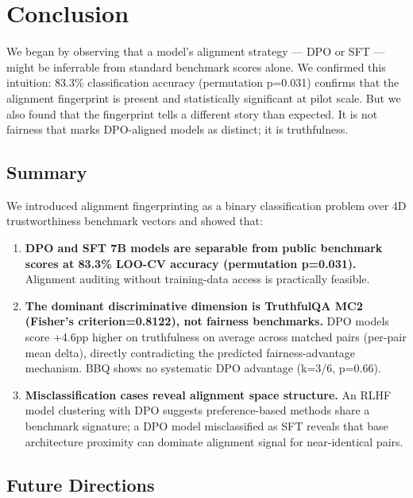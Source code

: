 \section{Conclusion}
\label{sec:conclusion}

We began by observing that a model's alignment strategy --- DPO or SFT --- might be
inferrable from standard benchmark scores alone. We confirmed this intuition: 83.3\%
classification accuracy (permutation p=0.031) confirms that the alignment fingerprint
is present and statistically significant at pilot scale. But we also found that the fingerprint tells a
different story than expected. It is not fairness that marks DPO-aligned models as
distinct; it is truthfulness.

\subsection*{Summary}

We introduced alignment fingerprinting as a binary classification problem over 4D
trustworthiness benchmark vectors and showed that:

\begin{enumerate}
  \item \textbf{DPO and SFT 7B models are separable from public benchmark scores at 83.3\% LOO-CV
    accuracy (permutation p=0.031).} Alignment auditing without training-data access is
    practically feasible.

  \item \textbf{The dominant discriminative dimension is TruthfulQA MC2 (Fisher's criterion=0.8122),
    not fairness benchmarks.} DPO models score +4.6pp higher on truthfulness on average
    across matched pairs (per-pair mean delta), directly contradicting the predicted
    fairness-advantage mechanism. BBQ shows no
    systematic DPO advantage (k=3/6, p=0.66).

  \item \textbf{Misclassification cases reveal alignment space structure.} An RLHF model clustering
    with DPO suggests preference-based methods share a benchmark signature; a DPO model
    misclassified as SFT reveals that base architecture proximity can dominate alignment
    signal for near-identical pairs.
\end{enumerate}

\subsection*{Future Directions}

